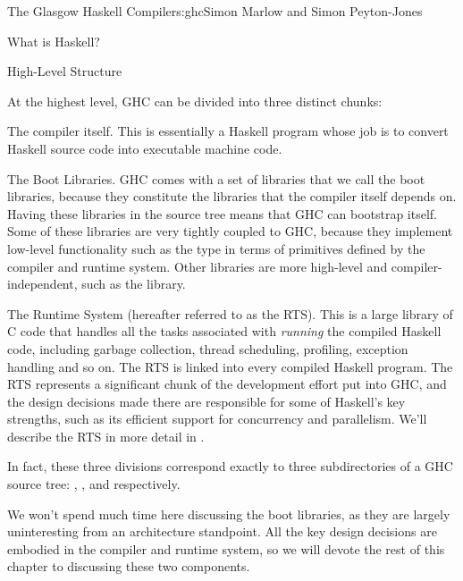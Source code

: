 \begin{aosachapter}{The Glasgow Haskell Compiler}{s:ghc}{Simon Marlow and Simon Peyton-Jones}
\begin{aosasect1}{What is Haskell?}
\end{aosasect1}

\begin{aosasect1}{High-Level Structure}

At the highest level, GHC can be divided into three distinct chunks:

\begin{aosaitemize}

\item The compiler itself.  This is essentially a Haskell program
  whose job is to convert Haskell source code into executable machine
  code.

\item The Boot Libraries.  GHC comes with a set of libraries that we
  call the boot libraries, because they constitute the libraries that
  the compiler itself depends on.  Having these libraries in the
  source tree means that GHC can bootstrap itself.  Some of these
  libraries are very tightly coupled to GHC, because they implement
  low-level functionality such as the  type in terms of
  primitives defined by the compiler and runtime system.  Other
  libraries are more high-level and compiler-independent, such as the
   library.

\item The Runtime System (hereafter referred to as the RTS).  This is
  a large library of C code that handles all the tasks associated with
  \emph{running} the compiled Haskell code, including garbage
  collection, thread scheduling, profiling, exception handling and so
  on.  The RTS is linked into every compiled Haskell program.  The RTS
  represents a significant chunk of the development effort put into
  GHC, and the design decisions made there are responsible for some of
  Haskell's key strengths, such as its efficient support for
  concurrency and parallelism.  We'll describe the RTS in more detail
  in .

\end{aosaitemize}

In fact, these three divisions correspond exactly to three
subdirectories of a GHC source tree: ,
, and  respectively.

We won't spend much time here discussing the boot libraries, as they
are largely uninteresting from an architecture standpoint.  All the
key design decisions are embodied in the compiler and runtime system,
so we will devote the rest of this chapter to discussing these two
components.


\end{aosasect1}
\end{aosachapter}
